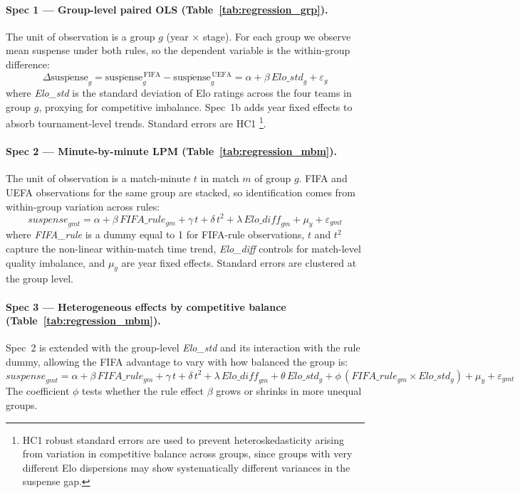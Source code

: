 \documentclass[11pt]{article}
\begin{document}
\paragraph{Spec 1 — Group-level paired OLS (Table~\ref{tab:regression_grp}).}
The unit of observation is a group $g$ (year $\times$ stage). For each group we observe mean suspense under both rules, so the dependent variable is the within-group difference:
\[
\Delta\overline{\text{suspense}}_g
  = \overline{\text{suspense}}^{\,\text{FIFA}}_g - \overline{\text{suspense}}^{\,\text{UEFA}}_g
  = \alpha + \beta\,\textit{Elo\_std}_g + \varepsilon_g
\]
where \textit{Elo\_std} is the standard deviation of Elo ratings across the four teams in group $g$, proxying for competitive imbalance. Spec~1b adds year fixed effects to absorb tournament-level trends. Standard errors are HC1  \footnote{HC1 robust standard errors are used to prevent heteroskedasticity arising from variation in competitive balance across groups, since groups with very different Elo dispersions may show systematically different variances in the suspense gap.}.

\paragraph{Spec 2 — Minute-by-minute LPM (Table~\ref{tab:regression_mbm}).}
The unit of observation is a match-minute $t$ in match $m$ of group $g$. FIFA and UEFA observations for the same group are stacked, so identification comes from within-group variation across rules:
\[
\textit{suspense}_{gmt}
  = \alpha + \beta\,\textit{FIFA\_rule}_{gm}
  + \gamma\,t + \delta\,t^2
  + \lambda\,\textit{Elo\_diff}_{gm}
  + \mu_y + \varepsilon_{gmt}
\]
where \textit{FIFA\_rule} is a dummy equal to 1 for FIFA-rule observations, $t$ and $t^2$ capture the non-linear within-match time trend, \textit{Elo\_diff} controls for match-level quality imbalance, and $\mu_y$ are year fixed effects. Standard errors are clustered at the group level.

\paragraph{Spec 3 — Heterogeneous effects by competitive balance (Table~\ref{tab:regression_mbm}).}
Spec~2 is extended with the group-level \textit{Elo\_std} and its interaction with the rule dummy, allowing the FIFA advantage to vary with how balanced the group is:
\[
\textit{suspense}_{gmt}
  = \alpha + \beta\,\textit{FIFA\_rule}_{gm}
  + \gamma\,t + \delta\,t^2
  + \lambda\,\textit{Elo\_diff}_{gm}
  + \theta\,\textit{Elo\_std}_g
  + \phi\,(\textit{FIFA\_rule}_{gm} \times \textit{Elo\_std}_g)
  + \mu_y + \varepsilon_{gmt}
\]
The coefficient $\phi$ tests whether the rule effect $\beta$ grows or shrinks in more unequal groups.
\end{document}
